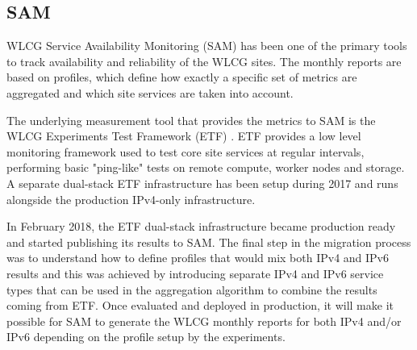 
\subsection{SAM}
WLCG Service Availability Monitoring (SAM) \cite{sam} has been one of the primary tools to track
availability and reliability of the WLCG sites. The monthly 
reports are based on profiles, which define how exactly a specific set of metrics are aggregated and which site services are taken into account. 

The underlying measurement tool that provides the metrics to SAM is the WLCG Experiments Test Framework (ETF) \cite{etf}. ETF provides a low level monitoring framework used to test core site services at regular intervals, performing basic "ping-like" tests on remote compute, worker nodes and storage. A separate dual-stack ETF infrastructure has been setup during 2017 and runs alongside the production IPv4-only infrastructure. %

In February 2018, the ETF dual-stack infrastructure became production ready and started publishing its results to SAM. The final step in the migration process was to understand how to define profiles that would mix both IPv4 and IPv6 results and this was achieved by introducing separate IPv4 and IPv6 service types that can be used in the aggregation algorithm to combine the results coming from ETF. 
Once evaluated and deployed in production, it will make it possible for SAM to generate the WLCG monthly 
reports for both IPv4 and/or IPv6 depending on the profile setup by the experiments. 


